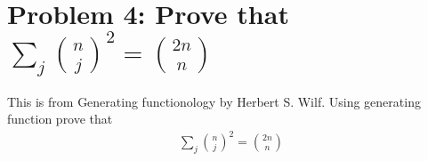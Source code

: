 ﻿\section{Problem 4: Prove that $\sum_{j} \binom{n}{j}^2 = \binom{2n}{n}$}
\label{sec:problem-4}
This is from Generating functionology by Herbert S. Wilf.
Using generating function prove that
\begin{align*}
    \sum_{j} \binom{n}{j}^2 = \binom{2n}{n}
\end{align*}

\clearpage
